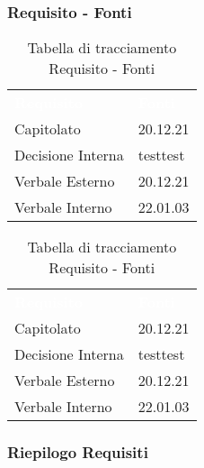 \subsubsection{Requisito - Fonti}

\begin{table}[!htbp]
\renewcommand{\arraystretch}{1.5}
\begin{tabular}{ m{}<{\centering}  m{}<{\centering} }
	\rowcolor{darkblue}
	\textcolor{white}{\textbf{Requisito}} &\textcolor{white}{\textbf{Fonti}}\\ 

	Capitolato & 20.12.21\\	

	\rowcolor{gray!10} Decisione Interna & testtest \\
	
	Verbale Esterno & 20.12.21\\
	
	\rowcolor{gray!10} Verbale Interno & 22.01.03 \\

\end{tabular}
\begin{tabular}{ m{}<{\centering}  m{}<{\centering} }
	\rowcolor{darkblue}
	\textcolor{white}{\textbf{Requisito}} &\textcolor{white}{\textbf{Fonti}}\\ 

	Capitolato & 20.12.21\\	

	\rowcolor{gray!10} Decisione Interna & testtest \\
	
	Verbale Esterno & 20.12.21\\
	
	\rowcolor{gray!10} Verbale Interno & 22.01.03 \\

\end{tabular}
\caption{Tabella di tracciamento Requisito - Fonti}
\end{table}

\subsubsection{Riepilogo Requisiti}

